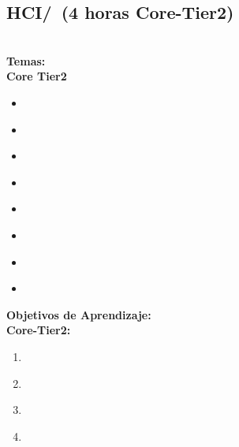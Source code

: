 \subsection{HCI/\HCIDesigningInteraction~(4 horas Core-Tier2)}\label{sec:BOK:HCIDesigningInteraction}
\HCIDesigningInteractionDescription\\
\noindent \textbf{Temas:}\\
\noindent \textbf{Core Tier2}
\begin{itemize}
	\item \HCIDesigningInteractionTopicPrinciplesOf\label{sec:BOK:HCIDesigningInteractionTopicPrinciplesOf}
	\item \HCIDesigningInteractionTopicElements\label{sec:BOK:HCIDesigningInteractionTopicElements}
	\item \HCIDesigningInteractionTopicTask\label{sec:BOK:HCIDesigningInteractionTopicTask}
	\item \HCIDesigningInteractionTopicLow\label{sec:BOK:HCIDesigningInteractionTopicLow}
	\item \HCIDesigningInteractionTopicQuantitative\label{sec:BOK:HCIDesigningInteractionTopicQuantitative}
	\item \HCIDesigningInteractionTopicHelp\label{sec:BOK:HCIDesigningInteractionTopicHelp}
	\item \HCIDesigningInteractionTopicHandling\label{sec:BOK:HCIDesigningInteractionTopicHandling}
	\item \HCIDesigningInteractionTopicUser\label{sec:BOK:HCIDesigningInteractionTopicUser}
\end{itemize}


\noindent \textbf{Objetivos de Aprendizaje:}\\
\noindent \textbf{Core-Tier2:}
\begin{enumerate}
	\setcounter{enumi}{0}
	\item \HCIDesigningInteractionLOForAn\xspace[\HCIDesigningInteractionLOForAnLevel]\label{sec:BOK:HCIDesigningInteractionLOForAn}
	\item \HCIDesigningInteractionLOCreateATogether\xspace[\HCIDesigningInteractionLOCreateATogetherLevel]\label{sec:BOK:HCIDesigningInteractionLOCreateATogether}
	\item \HCIDesigningInteractionLOConduct\xspace[\HCIDesigningInteractionLOConductLevel]\label{sec:BOK:HCIDesigningInteractionLOConduct}
	\item \HCIDesigningInteractionLODiscussAt\xspace[\HCIDesigningInteractionLODiscussAtLevel]\label{sec:BOK:HCIDesigningInteractionLODiscussAt}
\end{enumerate}


